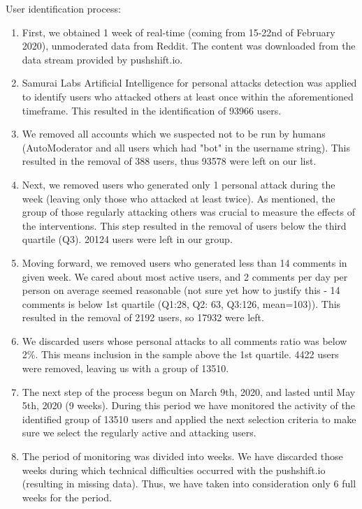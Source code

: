 \documentclass[
  10pt,
  dvipsnames,enabledeprecatedfontcommands]{scrartcl}
\begin{document}
User identification process:

\renewcommand{\labelenumii}{\Roman{enumii}}
 \begin{enumerate}
   \item First, we obtained 1 week of real-time (coming from 15-22nd of February 2020), unmoderated data from Reddit. The content was downloaded from the data stream provided by pushshift.io. 
   \item Samurai Labs Artificial Intelligence for personal attacks detection was applied to identify users who attacked others at least once within the aforementioned timeframe. This resulted in the identification of 93966 users. 
   \item We removed all accounts which we suspected not to be run by humans (AutoModerator and all users which had "bot" in the username string). This resulted in the removal of 388 users, thus 93578 were left on our list.
   \item Next, we removed users who generated only 1 personal attack during the week (leaving only those who attacked at least twice). As mentioned, the group of those regularly attacking others was crucial to measure the effects of the interventions. This step resulted in the removal of users below the third quartile (Q3). 20124 users were left in our group.
   \item Moving forward, we removed users who generated less than 14 comments in given week. We cared about most active users, and 2 comments per day per person on average seemed reasonable (not sure yet how to justify this - 14 comments is below 1st quartile (Q1:28, Q2: 63, Q3:126, mean=103)). This resulted in the removal of 2192 users, so 17932 were left.
   \item We discarded users whose personal attacks to all comments ratio was below 2\%. This means inclusion in the sample above the 1st quartile. 4422 users were removed, leaving us with a group of 13510. 
   \item The next step of the process begun on March 9th, 2020, and lasted until May 5th, 2020 (9 weeks). During this period we have monitored the activity of the identified group of 13510 users and applied the next selection criteria to make sure we select the regularly active and attacking users. 
   \item The period of monitoring was divided into weeks. We have discarded those weeks during which technical difficulties occurred with the pushshift.io (resulting in missing data). Thus, we have taken into consideration only 6 full weeks for the period.

\end{enumerate}
\end{document}
